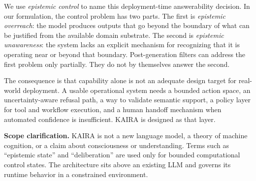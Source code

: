 \documentclass[11pt,a4paper]{article}
\begin{document}
We use \textit{epistemic control} to name this deployment-time answerability decision. In our formulation, the control problem has two parts. The first is \textit{epistemic overreach}: the model produces outputs that go beyond the boundary of what can be justified from the available domain substrate. The second is \textit{epistemic unawareness}: the system lacks an explicit mechanism for recognizing that it is operating near or beyond that boundary. Post-generation filters can address the first problem only partially. They do not by themselves answer the second.

The consequence is that capability alone is not an adequate design target for real-world deployment. A usable operational system needs a bounded action space, an uncertainty-aware refusal path, a way to validate semantic support, a policy layer for tool and workflow execution, and a human handoff mechanism when automated confidence is insufficient. KAIRA is designed as that layer.

\textbf{Scope clarification.} KAIRA is not a new language model, a theory of machine cognition, or a claim about consciousness or understanding. Terms such as ``epistemic state'' and ``deliberation'' are used only for bounded computational control states. The architecture sits above an existing LLM and governs its runtime behavior in a constrained environment.

\begin{table}[h]
\centering
\caption{Comparative positioning across architectural dimensions.}
\label{tab:paradigm}
\end{table}
\end{document}

